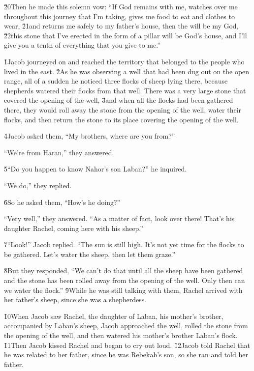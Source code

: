 \v{20}Then he made this solemn vow: ``If God remains with me, watches over me throughout this journey that I'm taking, gives me food to eat and clothes to wear, \v{21}and returns me safely to my father's house, then the  will be my God, \v{22}this stone that I've erected in the form of a pillar will be God's house, and I'll give you a tenth of everything that you give to me.''

\v{1}Jacob journeyed on and reached the territory that belonged to the people who lived in the east. \v{2}As he was observing a well that had been dug out on the open range, all of a sudden he noticed three flocks of sheep lying there, because shepherds watered their flocks from that well. There was a very large stone that covered the opening of the well, \v{3}and when all the flocks had been gathered there, they would roll away the stone from the opening of the well, water their flocks, and then return the stone to its place covering the opening of the well.

\v{4}Jacob asked them, ``My brothers, where are you from?''

``We're from Haran,'' they answered.

\v{5}``Do you happen to know Nahor's son Laban?'' he inquired.

``We do,'' they replied.

\v{6}So he asked them, ``How's he doing?''

``Very well,'' they answered. ``As a matter of fact, look over there! That's his daughter Rachel, coming here with his sheep.''

\v{7}``Look!'' Jacob replied. ``The sun is still high. It's not yet time for the flocks to be gathered. Let's water the sheep, then let them graze.''

\v{8}But they responded, ``We can't do that until all the sheep have been gathered and the stone has been rolled away from the opening of the well. Only then can we water the flock.'' \v{9}While he was still talking with them, Rachel arrived with her father's sheep, since she was a shepherdess.

\v{10}When Jacob saw Rachel, the daughter of Laban, his mother's brother, accompanied by Laban's sheep, Jacob approached the well, rolled the stone from the opening of the well, and then watered his mother's brother Laban's flock. \v{11}Then Jacob kissed Rachel and began to cry out loud. \v{12}Jacob told Rachel that he was related to her father, since he was Rebekah's son, so she ran and told her father.

